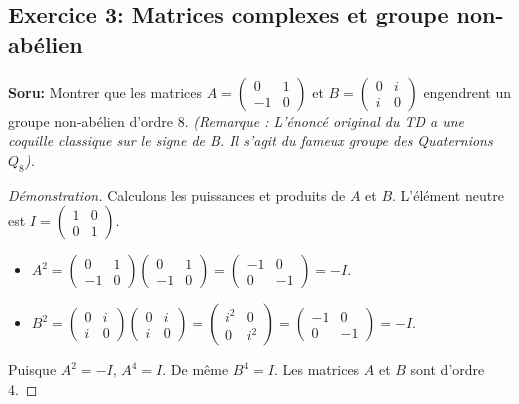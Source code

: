 \documentclass[12pt,a4paper]{report}
\begin{document}
\subsection*{Exercice 3: Matrices complexes et groupe non-abélien}
\textbf{Soru:} Montrer que les matrices $A = \begin{pmatrix} 0 & 1 \\ -1 & 0 \end{pmatrix}$ et $B = \begin{pmatrix} 0 & i \\ i & 0 \end{pmatrix}$ engendrent un groupe non-abélien d'ordre 8.
\textit{(Remarque : L'énoncé original du TD a une coquille classique sur le signe de B. Il s'agit du fameux groupe des Quaternions $Q_8$).}

\begin{proof}[Démonstration]
Calculons les puissances et produits de $A$ et $B$. L'élément neutre est $I = \begin{pmatrix} 1 & 0 \\ 0 & 1 \end{pmatrix}$.
\begin{itemize}
    \item $A^2 = \begin{pmatrix} 0 & 1 \\ -1 & 0 \end{pmatrix} \begin{pmatrix} 0 & 1 \\ -1 & 0 \end{pmatrix} = \begin{pmatrix} -1 & 0 \\ 0 & -1 \end{pmatrix} = -I$.
    \item $B^2 = \begin{pmatrix} 0 & i \\ i & 0 \end{pmatrix} \begin{pmatrix} 0 & i \\ i & 0 \end{pmatrix} = \begin{pmatrix} i^2 & 0 \\ 0 & i^2 \end{pmatrix} = \begin{pmatrix} -1 & 0 \\ 0 & -1 \end{pmatrix} = -I$.
\end{itemize}
Puisque $A^2 = -I$, $A^4 = I$. De même $B^4 = I$. Les matrices $A$ et $B$ sont d'ordre 4.

\end{proof}
\end{document}
